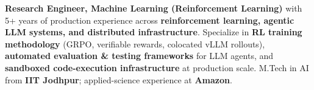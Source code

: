 \documentclass[letter,10pt]{article}
\begin{document}

\textbf{Research Engineer, Machine Learning (Reinforcement Learning)} with 5+ years of production experience across \textbf{reinforcement learning, agentic LLM systems, and distributed infrastructure}.
Specialize in \textbf{RL training methodology} (GRPO, verifiable rewards, colocated vLLM rollouts), \textbf{automated evaluation \& testing frameworks} for LLM agents, and \textbf{sandboxed code-execution infrastructure} at production scale.
M.Tech in AI from \textbf{IIT Jodhpur}; applied-science experience at \textbf{Amazon}.
\end{document}
